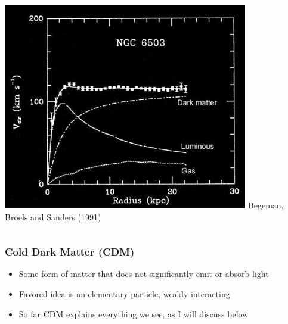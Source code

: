 \documentclass{beamer}
\begin{document}
{\begin{columns}
\begin{column}{0.5\textwidth}
\begin{center}
                \includegraphics[width=0.8\textwidth]{ngc-6503-rotation-curve.jpg}
                \newline
                {\tiny Begeman, Broels and Sanders (1991)}
            \end{center}
        \end{column}
    \end{columns}
}

\frame
{
    \frametitle{Cold Dark Matter (CDM)}


    \begin{itemize}

        \item Some form of matter that does not significantly emit or absorb light

        \item Favored idea is an elementary particle, weakly interacting

        \item So far CDM explains everything we see, as I will discuss below

    \end{itemize}


}
\end{document}
